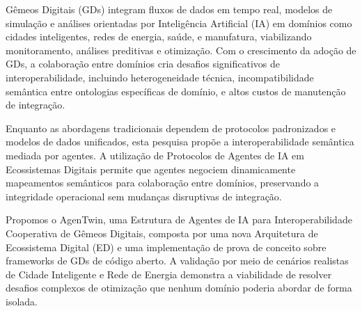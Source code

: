 \begin{translatedabstract}

Gêmeos Digitais (GDs) integram fluxos de dados em tempo real, modelos de simulação e análises orientadas por Inteligência Artificial (IA) em domínios como
    cidades inteligentes,
    redes de energia,
    saúde, e
    manufatura,
    viabilizando monitoramento, análises preditivas e otimização.
Com o crescimento da adoção de GDs, a colaboração entre domínios cria desafios significativos de interoperabilidade, incluindo
    heterogeneidade técnica,
    incompatibilidade semântica entre ontologias específicas de domínio, e
    altos custos de manutenção de integração.

Enquanto as abordagens tradicionais dependem de protocolos padronizados e modelos de dados unificados, esta pesquisa propõe a interoperabilidade semântica mediada por agentes.
A utilização de Protocolos de Agentes de IA em Ecossistemas Digitais permite que
    agentes negociem dinamicamente mapeamentos semânticos para colaboração entre domínios,
    preservando a integridade operacional sem mudanças disruptivas de integração.

Propomos o AgenTwin, uma Estrutura de Agentes de IA para Interoperabilidade Cooperativa de Gêmeos Digitais, composta por
    uma nova Arquitetura de Ecossistema Digital (ED) e
    uma implementação de prova de conceito sobre frameworks de GDs de código aberto.
A validação por meio de cenários realistas de Cidade Inteligente e Rede de Energia demonstra
    a viabilidade de resolver desafios complexos de otimização que nenhum domínio poderia abordar de forma isolada.
\end{translatedabstract}
